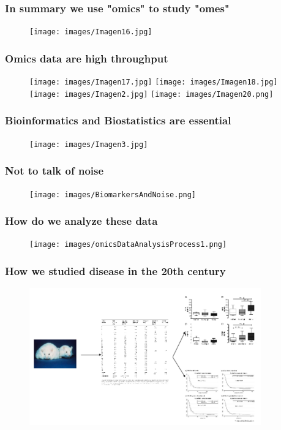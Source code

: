\documentclass{beamer}
\begin{document}
   
  \begin{frame}
  	\frametitle{In summary we use "omics" to study "omes"}
  	\begin{figure}[ht]
  		\centering
  		\texttt{[image: images/Imagen16.jpg]}
  	\end{figure} 
  \end{frame}
  
  
  \begin{frame}
  	\frametitle{Omics data are high throughput}
  	\begin{figure}[ht]
  		\centering
  		\texttt{[image: images/Imagen17.jpg]}
  		\texttt{[image: images/Imagen18.jpg]}\\
  		\texttt{[image: images/Imagen2.jpg]}
  		\texttt{[image: images/Imagen20.png]}
  	\end{figure} 
  \end{frame}
  
  
  \begin{frame}
  	\frametitle{Bioinformatics and Biostatistics are essential}
  	\begin{figure}[ht]
  		\centering
  		\texttt{[image: images/Imagen3.jpg]}
  	\end{figure} 
  \end{frame}

  \begin{frame}
	\frametitle{Not to talk of noise}
	\begin{figure}[ht]
		\centering
		\texttt{[image: images/BiomarkersAndNoise.png]}
	\end{figure} 
\end{frame}

  \begin{frame}
	\frametitle{How do we analyze these data}
	\begin{figure}[ht]
		\centering
		\texttt{[image: images/omicsDataAnalysisProcess1.png]}
	\end{figure} 
\end{frame}


\begin{frame}
	\frametitle{How we studied disease in the 20th century}
	\begin{figure}[ht]
		\centering
		\includegraphics[width=100mm]{images/diseaseStudyClassic.png}
	\end{figure} 
\end{frame}
\end{document}
